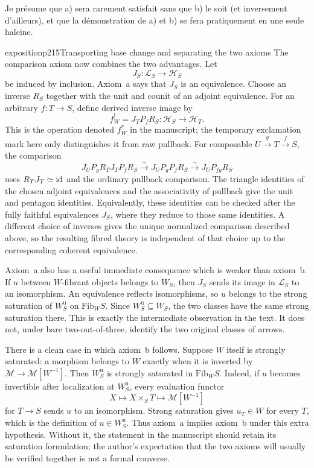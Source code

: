 Je présume que a) sera rarement satisfait sans que b) le soit (et inversement d'ailleurs), et que la démonstration de a) et b) se fera pratiquement en une seule haleine.

\begin{dcomment}{exposition}{p215}{Transporting base change and separating the two axioms}
The comparison axiom now combines the two advantages. Let
\[
 J_S:\mathcal L_S\longrightarrow\mathcal H_S
\]
be induced by inclusion. Axiom~a says that $J_S$ is an equivalence. Choose an inverse $R_S$ together with the unit and counit of an adjoint equivalence. For an arbitrary $f:T\to S$, define derived inverse image by
\[
 f^!_W=J_TP_fR_S:\mathcal H_S\longrightarrow\mathcal H_T.
\]
This is the operation denoted $f^*_W$ in the manuscript; the temporary exclamation mark here only distinguishes it from raw pullback. For composable $U\xrightarrow{g}T\xrightarrow{f}S$, the comparison
\[
 J_UP_gR_TJ_TP_fR_S\xrightarrow{\sim}
 J_UP_gP_fR_S\xrightarrow{\sim}J_UP_{fg}R_S
\]
uses $R_TJ_T\simeq\mathrm{id}$ and the ordinary pullback comparison. The triangle identities of the chosen adjoint equivalences and the associativity of pullback give the unit and pentagon identities. Equivalently, these identities can be checked after the fully faithful equivalences $J_S$, where they reduce to those same identities. A different choice of inverses gives the unique normalized comparison described above, so the resulting fibred theory is independent of that choice up to the corresponding coherent equivalence.

Axiom~a also has a useful immediate consequence which is weaker than axiom~b. If $u$ between $W$-fibrant objects belongs to $W_S$, then $J_S$ sends its image in $\mathcal L_S$ to an isomorphism. An equivalence reflects isomorphisms, so $u$ belongs to the strong saturation of $W_S^{\mathrm u}$ on $\mathrm{Fib}_W S$. Since $W_S^{\mathrm u}\subseteq W_S$, the two classes have the same strong saturation there. This is exactly the intermediate observation in the text. It does not, under bare two-out-of-three, identify the two original classes of arrows.

There is a clean case in which axiom~b follows. Suppose $W$ itself is strongly saturated: a morphism belongs to $W$ exactly when it is inverted by $\mathcal M\to\mathcal M[W^{-1}]$. Then $W_S^{\mathrm u}$ is strongly saturated in $\mathrm{Fib}_W S$. Indeed, if $u$ becomes invertible after localization at $W_S^{\mathrm u}$, every evaluation functor
\[
 X\longmapsto X\times_ST\longmapsto
 \mathcal M[W^{-1}]
\]
for $T\to S$ sends $u$ to an isomorphism. Strong saturation gives $u_T\in W$ for every $T$, which is the definition of $u\in W_S^{\mathrm u}$. Thus axiom~a implies axiom~b under this extra hypothesis. Without it, the statement in the manuscript should retain its saturation formulation; the author's expectation that the two axioms will usually be verified together is not a formal converse.


\end{dcomment}
